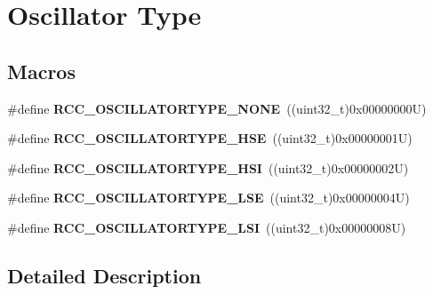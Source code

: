 \hypertarget{group___r_c_c___oscillator___type}{}\section{Oscillator Type}
\label{group___r_c_c___oscillator___type}
\subsection*{Macros}
\begin{DoxyCompactItemize}
\item 
\mbox{\label{group___r_c_c___oscillator___type_ga5a790362c5d7c4263f0f75a7367dd6b9}} 
\#define {\bfseries R\+C\+C\+\_\+\+O\+S\+C\+I\+L\+L\+A\+T\+O\+R\+T\+Y\+P\+E\+\_\+\+N\+O\+NE}~((uint32\+\_\+t)0x00000000\+U)
\item 
\mbox{\label{group___r_c_c___oscillator___type_ga28cacd402dec84e548c9e4ba86d4603f}} 
\#define {\bfseries R\+C\+C\+\_\+\+O\+S\+C\+I\+L\+L\+A\+T\+O\+R\+T\+Y\+P\+E\+\_\+\+H\+SE}~((uint32\+\_\+t)0x00000001\+U)
\item 
\mbox{\label{group___r_c_c___oscillator___type_gaa7ff7cbe9b0c2c511b0d0555e2a32a23}} 
\#define {\bfseries R\+C\+C\+\_\+\+O\+S\+C\+I\+L\+L\+A\+T\+O\+R\+T\+Y\+P\+E\+\_\+\+H\+SI}~((uint32\+\_\+t)0x00000002\+U)
\item 
\mbox{\label{group___r_c_c___oscillator___type_ga7036aec5659343c695d795e04d9152ba}} 
\#define {\bfseries R\+C\+C\+\_\+\+O\+S\+C\+I\+L\+L\+A\+T\+O\+R\+T\+Y\+P\+E\+\_\+\+L\+SE}~((uint32\+\_\+t)0x00000004\+U)
\item 
\mbox{\label{group___r_c_c___oscillator___type_ga3b7abb8ce0544cca0aa4550540194ce2}} 
\#define {\bfseries R\+C\+C\+\_\+\+O\+S\+C\+I\+L\+L\+A\+T\+O\+R\+T\+Y\+P\+E\+\_\+\+L\+SI}~((uint32\+\_\+t)0x00000008\+U)
\end{DoxyCompactItemize}


\subsection{Detailed Description}
